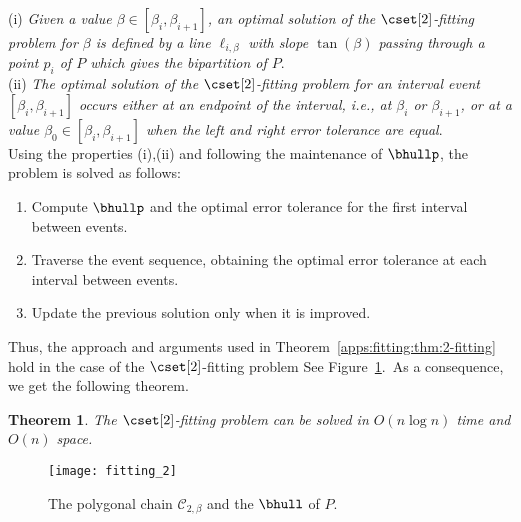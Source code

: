 \documentclass[11pt,letterpaper,english]{article}
\newtheorem{theorem}{Theorem}
\theoremstyle{definition}
\begin{document}
(i) \emph{Given a value $\beta\in [\beta_i,\beta_{i+1}]$, an optimal
  solution of the $\cset[2]$-fitting problem for $\beta$ is defined by
  a line $\ell_{i,\beta}$ with slope
  $\tan(\beta)$ passing through a point $p_i$ of $P$ which gives the bipartition of $P$}.\\

(ii) \emph{The optimal solution of the $\cset[2]$-fitting problem for
  an interval event $[\beta_i,\beta_{i+1}]$ occurs either at an
  endpoint of the interval, i.e., at $\beta_i$ or $\beta_{i+1}$, or at
  a value $\beta_0 \in [\beta_i,\beta_{i+1}]$
  when the left and right error tolerance are equal}.\\

Using the properties (i),(ii) and following the maintenance of
$\bhullp$, the problem is solved as follows:
\begin{enumerate}
\item Compute $\bhullp$ and the optimal error tolerance for the first
  interval between events.
\item Traverse the event sequence, obtaining the optimal error
  tolerance at each interval between events.
\item Update the previous solution only when it is improved.
\end{enumerate}

Thus, the approach and arguments used in
Theorem~\ref{apps:fitting:thm:2-fitting} hold in the case of the
$\cset[2]$-fitting problem See
Figure~\ref{apps:fitting:fig:fitting}.~As a consequence, we get the
following theorem.

\begin{theorem}
  \label{apps:fitting:thm:fitting}
  The $\cset[2]$-fitting problem can be solved in $O(n\log n)$
  time and $O(n)$ space.
\end{theorem}





\begin{figure}[H]
  \centering
  \begin{minipage}{0.9\textwidth}
    \centering
    {\texttt{[image: fitting\_2]}}
    \caption{The polygonal chain $\mathcal{C}_{2,\beta}$ and the
      $\bhull$ of $P$.}
    \label{apps:fitting:fig:fitting}
  \end{minipage}
\end{figure}
\end{document}
